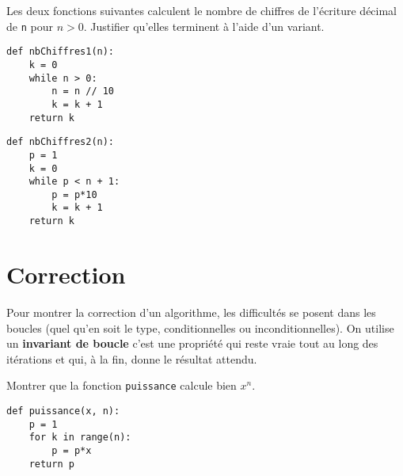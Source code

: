 
\entrainement

Les deux fonctions suivantes calculent le nombre de chiffres de l'écriture décimal de \verb+n+ pour $n>0$. Justifier qu'elles terminent à l'aide d'un variant.

\begin{minipage}{0.45\linewidth} 
 \begin{lstlisting}
def nbChiffres1(n):
    k = 0
    while n > 0:
        n = n // 10
        k = k + 1
    return k
\end{lstlisting}

\end{minipage}
\hfill 
\begin{minipage}{0.45\linewidth} 
\begin{lstlisting}
def nbChiffres2(n):
    p = 1
    k = 0
    while p < n + 1:
        p = p*10
        k = k + 1
    return k
\end{lstlisting}

\end{minipage}


\section{Correction}

Pour montrer la correction d'un algorithme, les difficultés se posent dans les boucles (quel qu'en soit le type, conditionnelles ou inconditionnelles). On utilise un {\bf invariant de boucle} c'est une propriété qui reste vraie tout au long des itérations et qui, à la fin, donne le résultat attendu.

\exercice{} Montrer que la fonction \verb+puissance+ calcule bien $x^{n}$.

\begin{minipage}{0.45\linewidth} %
\begin{minipage}{0.9\linewidth}
\begin{lstlisting}
def puissance(x, n):
    p = 1
    for k in range(n):
        p = p*x
    return p

\end{lstlisting}
\end{minipage}
\hskip 1cm
 
\end{minipage}%
\hfill 
\begin{minipage}{0.5\linewidth} 
\end{minipage}

 

